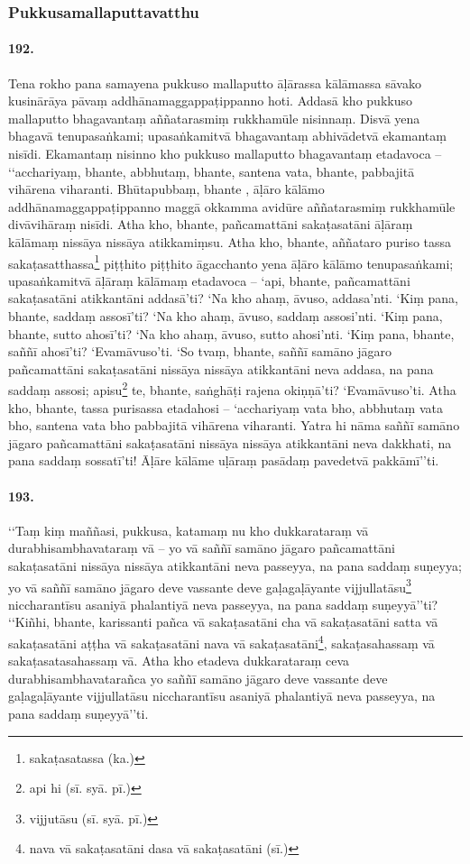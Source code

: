 \subsubsection{Pukkusamallaputtavatthu}

\paragraph{192.} Tena rokho pana samayena pukkuso mallaputto āḷārassa kālāmassa sāvako kusinārāya pāvaṃ addhānamaggappaṭippanno hoti. Addasā kho pukkuso mallaputto bhagavantaṃ aññatarasmiṃ rukkhamūle nisinnaṃ. Disvā yena bhagavā tenupasaṅkami; upasaṅkamitvā bhagavantaṃ abhivādetvā ekamantaṃ nisīdi. Ekamantaṃ nisinno kho pukkuso mallaputto bhagavantaṃ etadavoca – ‘‘acchariyaṃ, bhante, abbhutaṃ, bhante, santena vata, bhante, pabbajitā vihārena viharanti. Bhūtapubbaṃ, bhante , āḷāro kālāmo addhānamaggappaṭippanno maggā okkamma avidūre aññatarasmiṃ rukkhamūle divāvihāraṃ nisīdi. Atha kho, bhante, pañcamattāni sakaṭasatāni āḷāraṃ kālāmaṃ nissāya nissāya atikkamiṃsu. Atha kho, bhante, aññataro puriso tassa sakaṭasatthassa\footnote{sakaṭasatassa (ka.)} piṭṭhito piṭṭhito āgacchanto yena āḷāro kālāmo tenupasaṅkami; upasaṅkamitvā āḷāraṃ kālāmaṃ etadavoca – ‘api, bhante, pañcamattāni sakaṭasatāni atikkantāni addasā’ti? ‘Na kho ahaṃ, āvuso, addasa’nti. ‘Kiṃ pana, bhante, saddaṃ assosī’ti? ‘Na kho ahaṃ, āvuso, saddaṃ assosi’nti. ‘Kiṃ pana, bhante, sutto ahosī’ti? ‘Na kho ahaṃ, āvuso, sutto ahosi’nti. ‘Kiṃ pana, bhante, saññī ahosī’ti? ‘Evamāvuso’ti. ‘So tvaṃ, bhante, saññī samāno jāgaro pañcamattāni sakaṭasatāni nissāya nissāya atikkantāni neva addasa, na pana saddaṃ assosi; apisu\footnote{api hi (sī. syā. pī.)} te, bhante, saṅghāṭi rajena okiṇṇā’ti? ‘Evamāvuso’ti. Atha kho, bhante, tassa purisassa etadahosi – ‘acchariyaṃ vata bho, abbhutaṃ vata bho, santena vata bho pabbajitā vihārena viharanti. Yatra hi nāma saññī samāno jāgaro pañcamattāni sakaṭasatāni nissāya nissāya atikkantāni neva dakkhati, na pana saddaṃ sossatī’ti! Āḷāre kālāme uḷāraṃ pasādaṃ pavedetvā pakkāmī’’ti.

\paragraph{193.} ‘‘Taṃ kiṃ maññasi, pukkusa, katamaṃ nu kho dukkarataraṃ vā durabhisambhavataraṃ vā – yo vā saññī samāno jāgaro pañcamattāni sakaṭasatāni nissāya nissāya atikkantāni neva passeyya, na pana saddaṃ suṇeyya; yo vā saññī samāno jāgaro deve vassante deve gaḷagaḷāyante vijjullatāsu\footnote{vijjutāsu (sī. syā. pī.)} niccharantīsu asaniyā phalantiyā neva passeyya, na pana saddaṃ suṇeyyā’’ti? ‘‘Kiñhi, bhante, karissanti pañca vā sakaṭasatāni cha vā sakaṭasatāni satta vā sakaṭasatāni aṭṭha vā sakaṭasatāni nava vā sakaṭasatāni\footnote{nava vā sakaṭasatāni dasa vā sakaṭasatāni (sī.)}, sakaṭasahassaṃ vā sakaṭasatasahassaṃ vā. Atha kho etadeva dukkarataraṃ ceva durabhisambhavatarañca yo saññī samāno jāgaro deve vassante deve gaḷagaḷāyante vijjullatāsu niccharantīsu asaniyā phalantiyā neva passeyya, na pana saddaṃ suṇeyyā’’ti.

